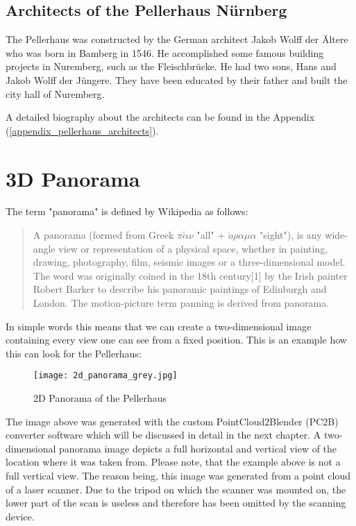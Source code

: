 \subsection{Architects of the Pellerhaus Nürnberg}

The Pellerhaus was constructed by the German architect Jakob Wolff der Ältere who was born in Bamberg in 1546. He accomplished some famous building projects in Nuremberg, such as the Fleischbrücke. He had two sons, Hans and Jakob Wolff der Jüngere. They have been educated by their father and built the city hall of Nuremberg.

A detailed biography about the architects can be found in the Appendix (\ref{appendix_pellerhaus_architects}).

\section{3D Panorama}

The term "panorama" is defined by Wikipedia \parencite{wiki:Panorama} as follows:


\blockquote{
	A panorama (formed from Greek {$\pi\tilde{\alpha}\nu $} "all" + {$\ddot{o}\rho\alpha\mu\alpha$} "sight"), is any wide-angle view or representation of a physical space, whether in painting, drawing, photography, film, seismic images or a three-dimensional model. The word was originally coined in the 18th century[1] by the Irish painter Robert Barker to describe his panoramic paintings of Edinburgh and London. The motion-picture term panning is derived from panorama.
}

In simple words this means that we can create a two-dimensional image containing every view one can see from a fixed position. This is an example how this can look for the Pellerhaus:

\begin{figure}[h]
	\centering
	\texttt{[image: 2d\_panorama\_grey.jpg]}
	\caption{2D Panorama of the Pellerhaus}
	\label{fig:2d_panorama}
\end{figure}

The image above was generated with the custom PointCloud2Blender (PC2B) converter software which will be discussed in detail in the next chapter. A two-dimensional panorama image depicts a full horizontal and vertical view of the location where it was taken from. Please note, that the example above is not a full vertical view. The reason being, this image was generated from a point cloud of a laser scanner. Due to the tripod on which the scanner was mounted on, the lower part of the scan is useless and therefore has been omitted by the scanning device.

